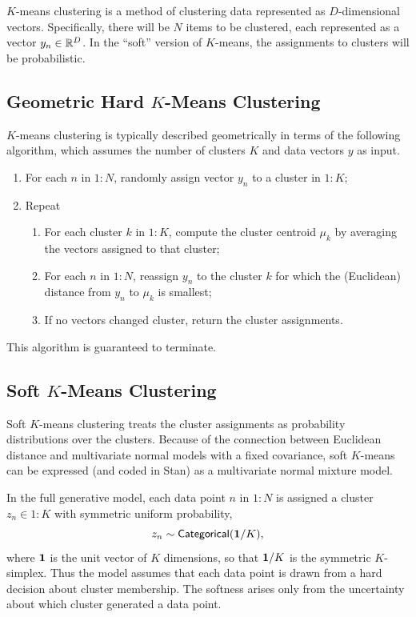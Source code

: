 $K$-means clustering is a method of clustering data represented as
$D$-dimensional vectors.  Specifically, there will be $N$ items to be
clustered, each represented as a vector $y_n \in \reals^D$.  In the
``soft'' version of $K$-means, the assignments to clusters will be
probabilistic.  

\subsection{Geometric Hard  $K$-Means Clustering}

$K$-means clustering is typically described geometrically in terms of
the following algorithm, which assumes the number of clusters $K$ and
data vectors $y$ as input.
%
\begin{enumerate}
\item For each $n$ in $1:N$, randomly assign vector $y_n$ to a cluster in $1{:}K$;
\item Repeat
\begin{enumerate} 
\item For each cluster $k$ in $1{:}K$, compute the cluster centroid $\mu_k$  by averaging the
  vectors assigned to that cluster;
\item For each $n$ in $1:N$, reassign $y_n$ to the cluster $k$
  for which the (Euclidean) distance from $y_n$ to $\mu_k$ is smallest;
\item If no vectors changed cluster, return the cluster assignments.
\end{enumerate}
\end{enumerate}
%
This algorithm is guaranteed to terminate.

\subsection{Soft $K$-Means Clustering}

Soft $K$-means clustering treats the cluster assignments as
probability distributions over the clusters.  Because of the
connection between Euclidean distance and multivariate normal models
with a fixed covariance, soft $K$-means can be expressed (and coded in
Stan) as a multivariate normal mixture model.

In the full generative model, each data point $n$ in $1{:}N$ is assigned
a cluster $z_n \in 1{:}K$ with symmetric uniform probability,
%
\[
z_n \sim \distro{Categorical}({\bf 1}/K),
\]
where ${\bf 1}$ is the unit vector of $K$ dimensions, so that ${\bf
  1}/K$ is the symmetric $K$-simplex.  Thus the model assumes that
each data point is drawn from a hard decision about cluster
membership.  The softness arises only from the uncertainty about which
cluster generated a data point.


